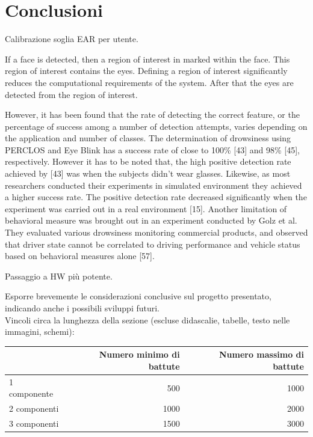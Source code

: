 \documentclass[12pt]{article}
\begin{document}
\newpage



\section{Conclusioni}

Calibrazione soglia EAR per utente.

If a face is detected, then a region of interest in marked within the face. This region of interest contains the eyes. Defining a region of interest significantly reduces the computational requirements of the system. After that the eyes are detected from the region of interest.

However, it has been found that the rate of detecting the correct feature, or the percentage of success among a number of detection attempts, varies depending on the application and number of classes. The determination of drowsiness using PERCLOS and Eye Blink has a success rate of close to 100\% [43] and 98\% [45], respectively. However it has to be noted that, the high positive detection rate achieved by [43] was when the subjects didn’t wear glasses. Likewise, as most researchers conducted their experiments in simulated environment they achieved a higher success rate. The positive detection rate decreased significantly when the experiment was carried out in a real environment [15].
Another limitation of behavioral measure was brought out in an experiment conducted by Golz et al. They evaluated various drowsiness monitoring commercial products, and observed that driver state cannot be correlated to driving performance and vehicle status based on behavioral measures alone [57].

Passaggio a HW più potente.

Esporre brevemente le considerazioni conclusive sul progetto presentato, indicando anche i possibili sviluppi futuri.\\

Vincoli circa la lunghezza della sezione (escluse didascalie, tabelle, testo nelle immagini, schemi):

\vspace{1cm}
\begin{tabular}{l|rr}
 & Numero minimo di battute & Numero massimo di battute \\
 \hline
 1 componente & 500 & 1000 \\
 2 componenti & 1000 & 2000 \\
 3 componenti & 1500 & 3000 \\
 \hline
\end{tabular}
\end{document}
